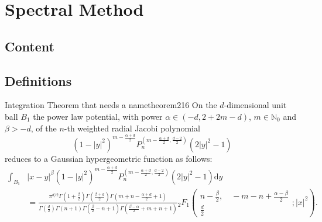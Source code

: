 \chapter{Spectral Method}
\label{chap:spectral-method}

\section{Content}


\section{Definitions}



















\begin{theorem}{Integration Theorem that needs a name}{theorem216}
  On the $d$-dimensional unit ball $B_1$ the power law potential, with power $\alpha \in(-d,2+2m-d)$, $m\in\mathbb{N}_0$ and $\beta>-d$, of the $n$-th weighted radial Jacobi polynomial $$(1-|y|^2)^{m-\frac{\alpha+d}{2}}P_n^{(m-\frac{\alpha+d}{2},\frac{d-2}{2})}(2|y|^2-1)$$ reduces to a Gaussian hypergeometric function as follows:
  \begin{align*}
    \int_{B_1} & |x-y|^\beta (1-|y|^2)^{m-\frac{\alpha+d}{2}} P_n^{(m-\frac{\alpha+d}{2},\frac{d-2}{2})}(2|y|^2-1) \mathrm{d}y                                                                                                                                                                                                                                                                                               \\
               & = \tfrac{\pi ^{d/2} \Gamma \left(1+\frac{\beta}{2}\right) \Gamma \left(\frac{\beta+d}{2}\right) \Gamma \left(m+n-\frac{\alpha+d}{2}+1\right)}{\Gamma \left(\frac{d}{2}\right) \Gamma (n+1) \Gamma \left(\frac{\beta}{2}-n+1\right) \Gamma \left(\frac{\beta-\alpha}{2}+m+n+1\right)}{}_2F_1\left(\begin{matrix}n-\frac{\beta}{2}, \quad -m-n+\frac{\alpha-\beta}{2} \\\frac{d}{2}\end{matrix};|x|^2\right).
  \end{align*}
\end{theorem}

